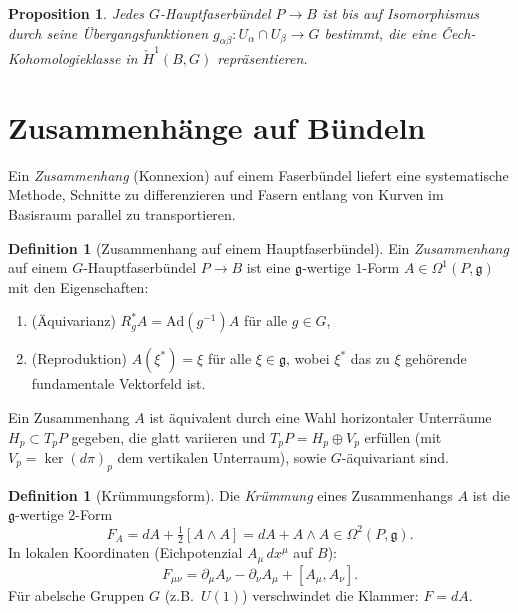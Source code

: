\documentclass[12pt,a4paper]{amsart}
\newtheorem{proposition}[theorem]{Proposition}
\theoremstyle{definition}
\newtheorem{definition}[theorem]{Definition}
\begin{document}
\begin{proposition}
Jedes $G$-Hauptfaserbündel $P \to B$ ist bis auf Isomorphismus durch seine
Übergangsfunktionen $g_{\alpha\beta} \colon U_\alpha \cap U_\beta \to G$
bestimmt, die eine \v{C}ech-Kohomologieklasse in $\check{H}^1(B, G)$
repräsentieren.
\end{proposition}

\section{Zusammenhänge auf Bündeln}
\label{sec:zusammenhaenge}

Ein \emph{Zusammenhang} (Konnexion) auf einem Faserbündel liefert eine
systematische Methode, Schnitte zu differenzieren und Fasern entlang von Kurven
im Basisraum parallel zu transportieren.

\begin{definition}[Zusammenhang auf einem Hauptfaserbündel]
Ein \emph{Zusammenhang} auf einem $G$-Hauptfaserbündel $P \to B$ ist eine
$\mathfrak{g}$-wertige $1$-Form $A \in \Omega^1(P, \mathfrak{g})$
mit den Eigenschaften:
\begin{enumerate}[noitemsep]
  \item (Äquivarianz)\; $R_g^* A = \mathrm{Ad}(g^{-1}) A$ für alle $g \in G$,
  \item (Reproduktion)\; $A(\xi^*) = \xi$ für alle $\xi \in \mathfrak{g}$,
        wobei $\xi^*$ das zu $\xi$ gehörende fundamentale Vektorfeld ist.
\end{enumerate}
\end{definition}

Ein Zusammenhang $A$ ist äquivalent durch eine Wahl horizontaler Unterräume
$H_p \subset T_p P$ gegeben, die glatt variieren und
$T_pP = H_p \oplus V_p$ erfüllen (mit $V_p = \ker(d\pi)_p$ dem vertikalen
Unterraum), sowie $G$-äquivariant sind.

\begin{definition}[Krümmungsform]
Die \emph{Krümmung} eines Zusammenhangs $A$ ist die $\mathfrak{g}$-wertige
$2$-Form
\[
  F_A = dA + \tfrac{1}{2}[A \wedge A] = dA + A \wedge A \in \Omega^2(P, \mathfrak{g}).
\]
In lokalen Koordinaten (Eichpotenzial $A_\mu \, dx^\mu$ auf $B$):
\[
  F_{\mu\nu} = \partial_\mu A_\nu - \partial_\nu A_\mu + [A_\mu, A_\nu].
\]
Für abelsche Gruppen $G$ (z.B.\ $U(1)$) verschwindet die Klammer: $F = dA$.
\end{definition}
\end{document}
